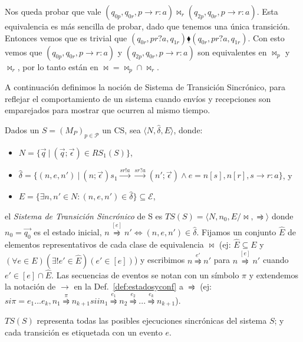 \begin{example}
Nos queda probar que vale $(q_{0p}, q_{0r}, p \rightarrow r:a) \bowtie_r (q_{2p}, q_{0r}, p \rightarrow r:a)$. Esta equivalencia es más sencilla de probar, dado que tenemos una única transición. Entonces vemos que es trivial que $(q_{0r}, pr?a, q_{1r}) \underline{\blacklozenge} (q_{0r}, pr?a, q_{1r})$. Con esto vemos que $(q_{0p}, q_{0r}, p \rightarrow r:a)$ y $(q_{2p}, q_{0r}, p \rightarrow r:a)$ son equivalentes en $\bowtie_p$ y $\bowtie_r$, por lo tanto están en $\bowtie = \bowtie_p \cap \bowtie_r$.
\end{example} 

A continuación definimos la noción de Sistema de Transición Sincrónico, para reflejar el comportamiento de un sistema cuando envíos y recepciones son emparejados para mostrar que ocurren al mismo tiempo.
\newpage

\begin{definition} Dados un $S = (M_P)_{p \in \mathcal{P}}$ un CS, sea $\langle N,\hat{\delta}, E \rangle$, donde: 
\begin{itemize}
    \item[] $N = \{\overrightarrow{q} \ | \ (\overrightarrow{q}; \overrightarrow{\epsilon}) \in RS_1(S) \}$,
    \item[] $\hat{\delta}= \{(n, e, n') \ | \ (n;\overrightarrow{\epsilon}) s_1 \overset{sr!a}{\longrightarrow}\overset{sr?a}{\longrightarrow} (n';\overrightarrow{\epsilon})	\land e= n[s], n[r], s \rightarrow r:a \}$, y
    \item[] $ E = \{ \exists n, n' \in N : (n,e,n') \in \hat{\delta}\} \subseteq \mathcal{E}$,
\end{itemize}
   el \emph{Sistema de Transición Sincrónico} de S es $TS(S)= \langle N, n_0, E/ \bowtie,\rightrightharpoons \rangle$ donde $n_0= \overrightarrow{q_0} $ es el estado inicial, $n \overset{[e]}{\rightrightharpoons} n' \iff (n,e,n') \in \hat{\delta}$. Fijamos un conjunto $\hat{E}$ de elementos representativos de cada clase de equivalencia $\bowtie$ (ej: $\hat{E} \subseteq E$ y $\left(\forall e \in E\right)\left(\exists!e' \in \hat{E}\right)\left(e' \in [e] \right)$) y escribimos $n \overset{e'}{\rightrightharpoons} n'$ para $ n \overset{[e]}{\rightrightharpoons} n'$ cuando $ e' \in [e] \cap \hat{E} $. Las secuencias de eventos se notan con un símbolo $\pi$ y extendemos la notación de $ \rightarrow$ en la Def.~\ref{def:estadosyconf} a $\rightrightharpoons$ (ej: $si \pi = e_1 ...e_k, n_1 \overset{\pi}{\rightrightharpoons}n_{k+1} sii n_1 \overset{e_1}{\rightrightharpoons} n_2 \overset{e_2}{\rightrightharpoons}...\overset{e_k}{\rightrightharpoons} n_{k+1}$).

$TS(S)$ representa todas las posibles ejecuciones sincrónicas del sistema $S$; y cada transición es etiquetada con un evento $e$.
\end{definition}

